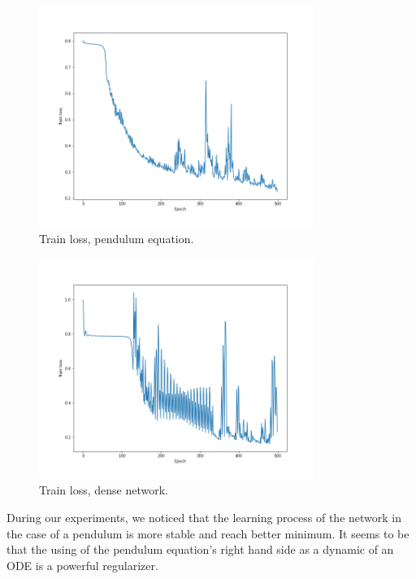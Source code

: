 \documentclass[../../main.tex]{subfiles}
\begin{document}
\begin{figure}[H]
\centering
\includegraphics[width=0.8\textwidth]{figures/pendulum_train.png}
\caption{Train loss, pendulum equation.}
\end{figure}


\begin{figure}[H]
\centering
\includegraphics[width=0.8\textwidth]{figures/dense_train.png}
\caption{Train loss, dense network.}
\end{figure}

During our experiments, we noticed that the learning process of the network in the case of a pendulum is more stable and reach better minimum. It seems to be that the using of the pendulum equation's right hand side as a dynamic of an ODE is a powerful regularizer.
\end{document}
